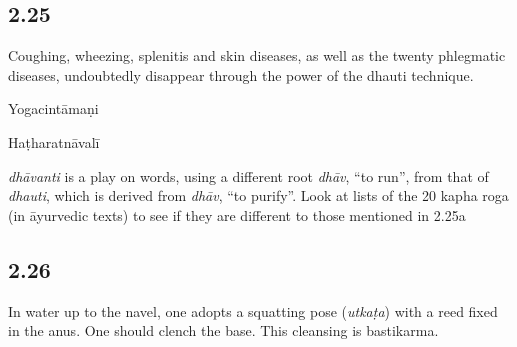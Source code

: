 \begin{ekdosis}
\subsection*{2.25}
\begin{translation}[hp02_025]
Coughing, wheezing, splenitis and skin diseases, as well as the twenty phlegmatic diseases, undoubtedly disappear through the power of the dhauti technique.
\end{translation}

\begin{sources}[hp02_025]
\end{sources}

\begin{testimonia}[hp02_025]
Yogacintāmaṇi

\begin{versinnote}
\end{versinnote}

Haṭharatnāvalī

\begin{versinnote}
\end{versinnote}
\end{testimonia}

\begin{philcomm}[hp02_025]
\emph{dhāvanti} is a play on words, using a different root \emph{dhāv}, “to run”, from that of \emph {dhauti}, which is derived from \emph{dhāv}, “to purify”.
Look at lists of the 20 kapha roga (in āyurvedic texts) to see if they are different to those mentioned in 2.25a
\end{philcomm}

\subsection*{2.26}
\begin{translation}[hp02_026]
In water up to the navel, one adopts a squatting pose (\emph{utkaṭa}) with a reed fixed in the anus. One should clench the base. This cleansing is bastikarma.
\end{translation}

\begin{sources}[hp02_026]
\end{sources}


\end{ekdosis}

